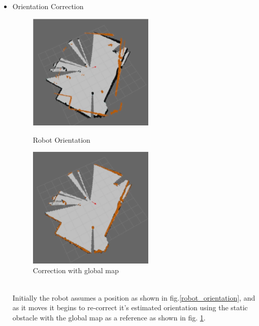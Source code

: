 \begin{itemize}
	\item Orientation Correction
	\begin{figure}[!htbp]
		\centering
		\begin{minipage}{.5\textwidth}
			\centering
			\includegraphics[width = 6cm]{Pictures/robotorientation}%
			\caption{Robot Orientation}
			\label{robot_orientation}
		\end{minipage}%
		\begin{minipage}{.5\textwidth}
			\centering
			\includegraphics[width = 6cm]{Pictures/correctionwithglobalmap}%
			\caption{Correction with global map}
			\label{correction_with_globalmap}
		\end{minipage}
	\end{figure}\\
 	Initially the robot assumes a position as shown in fig.\ref{robot_orientation}, and as it moves it begins to re-correct it's estimated orientation using the static obstacle with the global map as a reference as shown in fig. \ref{correction_with_globalmap}. 
\end{itemize}
